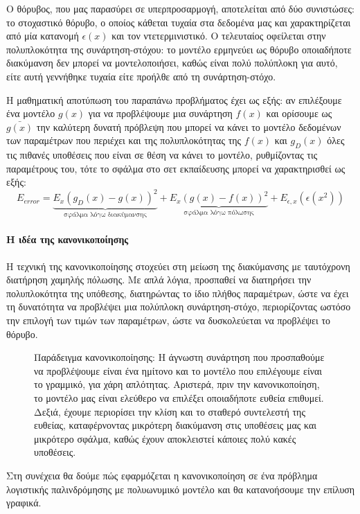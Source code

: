 Ο θόρυβος, που μας παρασύρει σε υπερπροσαρμογή, αποτελείται από δύο συνιστώσες: το στοχαστικό θόρυβο, ο οποίος κάθεται τυχαία στα δεδομένα μας και χαρακτηρίζεται από μία κατανομή $\epsilon(x)$ και τον ντετερμινιστικό. Ο τελευταίος οφείλεται στην πολυπλοκότητα της συνάρτηση-στόχου: το μοντέλο ερμηνεύει ως θόρυβο οποιαδήποτε διακύμανση δεν μπορεί να μοντελοποιήσει, καθώς είναι πολύ πολύπλοκη για αυτό, είτε αυτή γεννήθηκε τυχαία είτε προήλθε από τη συνάρτηση-στόχο.

Η μαθηματική αποτύπωση του παραπάνω προβλήματος έχει ως εξής: αν επιλέξουμε ένα μοντέλο $g(x)$ για να προβλέψουμε μια συνάρτηση $f(x)$ και ορίσουμε ως $\bar{g(x)}$ την καλύτερη δυνατή πρόβλεψη που μπορεί να κάνει το μοντέλο δεδομένων των παραμέτρων που περιέχει και της πολυπλοκότητας της $f(x)$ και $g_D(x)$ όλες τις πιθανές υποθέσεις που είναι σε θέση να κάνει το μοντέλο, ρυθμίζοντας τις παραμέτρους του, τότε το σφάλμα στο σετ εκπαίδευσης μπορεί να χαρακτηρισθεί ως εξής:
$$E_{error}=\underbrace{E_x(g_D(x) - g(x))^2}_{\text{σφάλμα λόγω  διακύμανσης}} + \underbrace{E_x(g(x)- f(x))^2}_{\text{σφάλμα λόγω πόλωσης}} + E_{\epsilon,x}(\epsilon(x^2))$$
\paragraph{Η ιδέα της κανονικοποίησης} Η τεχνική της κανονικοποίησης στοχεύει στη μείωση της διακύμανσης με ταυτόχρονη διατήρηση χαμηλής πόλωσης. Με απλά λόγια, προσπαθεί να διατηρήσει την πολυπλοκότητα της υπόθεσης, διατηρώντας το
ίδιο πλήθος παραμέτρων, ώστε να έχει τη δυνατότητα να προβλέψει μια πολύπλοκη συνάρτηση-στόχο, περιορίζοντας ωστόσο την επιλογή των τιμών των παραμέτρων, ώστε να δυσκολεύεται να προβλέψει το θόρυβο.
\begin{figure}[H]
	\centering			
	\caption[Παράδειγμα κανονικοποίησης]{Παράδειγμα κανονικοποίησης: Η άγνωστη συνάρτηση που προσπαθούμε να προβλέψουμε είναι ένα ημίτονο και το μοντέλο που επιλέγουμε είναι το γραμμικό, για χάρη απλότητας. Αριστερά, πριν την κανονικοποίηση, το μοντέλο μας είναι ελεύθερο να επιλέξει οποιαδήποτε ευθεία επιθυμεί. Δεξιά, έχουμε περιορίσει την κλίση και το σταθερό συντελεστή της ευθείας, καταφέρνοντας μικρότερη διακύμανση στις υποθέσεις μας και μικρότερο σφάλμα, καθώς έχουν αποκλειστεί κάποιες πολύ κακές υποθέσεις.}
\end{figure}

Στη συνέχεια θα δούμε πώς εφαρμόζεται η κανονικοποίηση σε ένα πρόβλημα λογιστικής παλινδρόμησης με πολυωνυμικό μοντέλο και θα κατανοήσουμε την επίλυση γραφικά.


